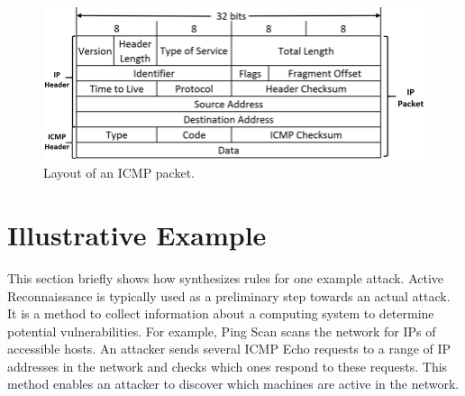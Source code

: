 \documentclass[sigconf,review, anonymous]{acmart}
\begin{document}
\begin{figure}[t!]
\centering
\includegraphics[scale=0.28]{figs/ICMP-packet-structure.png}
\vspace{-2ex}
\caption{Layout of an ICMP packet.}
\label{fig:icmp-packet-layout}
\end{figure}




\section{Illustrative Example}
\label{sec:suri-metas-coverage}
\label{sec:active-recon}

This section briefly shows how \tname{} synthesizes rules for one
example attack. Active Reconnaissance is typically used as a
preliminary step towards an actual attack. It is a method to collect
information about a computing system to determine potential
vulnerabilities. For example, Ping Scan scans the network for IPs of
accessible hosts. An attacker sends several ICMP Echo requests to a
range of IP addresses in the network and checks which ones respond to
these requests. This method enables an attacker to discover which
machines are active in the network.
\end{document}
